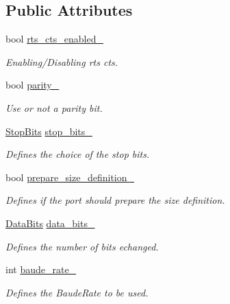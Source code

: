 \subsection*{Public Attributes}
\begin{DoxyCompactItemize}
\item 
bool \hyperlink{classreal__time__tools_1_1PortConfig_ad89a20459faf7718a63ea8c00ddc5e34}{rts\+\_\+cts\+\_\+enabled\+\_\+}
\begin{DoxyCompactList}\small\item\em Enabling/\+Disabling rts cts. \end{DoxyCompactList}\item 
\mbox{\label{classreal__time__tools_1_1PortConfig_afdc811c6c73ada4b21dab246bf086506}} 
bool \hyperlink{classreal__time__tools_1_1PortConfig_afdc811c6c73ada4b21dab246bf086506}{parity\+\_\+}
\begin{DoxyCompactList}\small\item\em Use or not a parity bit. \end{DoxyCompactList}\item 
\hyperlink{classreal__time__tools_1_1PortConfig_a62bbab15705e2d5a9bc17115222f7c07}{Stop\+Bits} \hyperlink{classreal__time__tools_1_1PortConfig_a3303d793237edbfa0b3c28f3f01c3837}{stop\+\_\+bits\+\_\+}
\begin{DoxyCompactList}\small\item\em Defines the choice of the stop bits. \end{DoxyCompactList}\item 
\mbox{\label{classreal__time__tools_1_1PortConfig_a6c1dbeb3cf3c772c9c1b4df71b8befd6}} 
bool \hyperlink{classreal__time__tools_1_1PortConfig_a6c1dbeb3cf3c772c9c1b4df71b8befd6}{prepare\+\_\+size\+\_\+definition\+\_\+}
\begin{DoxyCompactList}\small\item\em Defines if the port should prepare the size definition. \end{DoxyCompactList}\item 
\hyperlink{classreal__time__tools_1_1PortConfig_a11e818aa26cd0a941ff00b9ccd4d2131}{Data\+Bits} \hyperlink{classreal__time__tools_1_1PortConfig_af80f9991e3811392385208a9baf9c6fd}{data\+\_\+bits\+\_\+}
\begin{DoxyCompactList}\small\item\em Defines the number of bits echanged. \end{DoxyCompactList}\item 
int \hyperlink{classreal__time__tools_1_1PortConfig_aa0be2d74f3ac70e9f43d36fc0c70901a}{baude\+\_\+rate\+\_\+}
\begin{DoxyCompactList}\small\item\em Defines the Baude\+Rate to be used. \end{DoxyCompactList}\end{DoxyCompactItemize}



